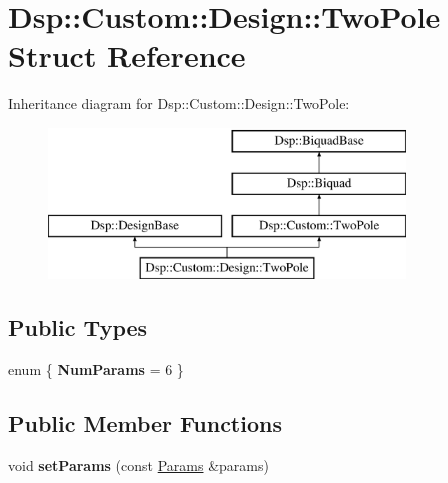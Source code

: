 \hypertarget{structDsp_1_1Custom_1_1Design_1_1TwoPole}{\section{Dsp\-:\-:Custom\-:\-:Design\-:\-:Two\-Pole Struct Reference}
\label{structDsp_1_1Custom_1_1Design_1_1TwoPole}
}
Inheritance diagram for Dsp\-:\-:Custom\-:\-:Design\-:\-:Two\-Pole\-:\begin{figure}[H]
\begin{center}
\leavevmode
\includegraphics[height=4.000000cm]{structDsp_1_1Custom_1_1Design_1_1TwoPole}
\end{center}
\end{figure}
\subsection*{Public Types}
\begin{DoxyCompactItemize}
\item 
enum \{ {\bfseries Num\-Params} =  6
 \}
\end{DoxyCompactItemize}
\subsection*{Public Member Functions}
\begin{DoxyCompactItemize}
\item 
\hypertarget{structDsp_1_1Custom_1_1Design_1_1TwoPole_a62984adb4abee8d3008848cdce3ac534}{void {\bfseries set\-Params} (const \hyperlink{structDsp_1_1Params}{Params} \&params)}\label{structDsp_1_1Custom_1_1Design_1_1TwoPole_a62984adb4abee8d3008848cdce3ac534}

\end{DoxyCompactItemize}
